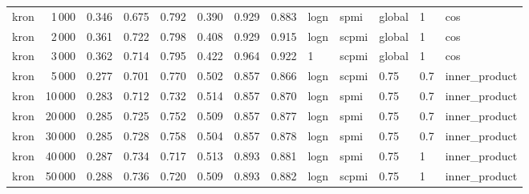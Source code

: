 \begin{tabular}{lrrrrrrrlllll}
    kron &            1\,000 &      0.346 &  0.675 &  0.792 &  0.390 &      0.929 &      0.883 &  logn &   spmi &  global &    1 &            cos \\
    kron &            2\,000 &      0.361 &  0.722 &  0.798 &  0.408 &      0.929 &      0.915 &  logn &  scpmi &  global &    1 &            cos \\
    kron &            3\,000 &      0.362 &  0.714 &  0.795 &  0.422 &      0.964 &      0.922 &     1 &  scpmi &  global &    1 &            cos \\
    kron &            5\,000 &      0.277 &  0.701 &  0.770 &  0.502 &      0.857 &      0.866 &  logn &  scpmi &    0.75 &  0.7 &  inner\_product \\
    kron &           10\,000 &      0.283 &  0.712 &  0.732 &  0.514 &      0.857 &      0.870 &  logn &   spmi &    0.75 &  0.7 &  inner\_product \\
    kron &           20\,000 &      0.285 &  0.725 &  0.752 &  0.509 &      0.857 &      0.877 &  logn &   spmi &    0.75 &  0.7 &  inner\_product \\
    kron &           30\,000 &      0.285 &  0.728 &  0.758 &  0.504 &      0.857 &      0.878 &  logn &   spmi &    0.75 &  0.7 &  inner\_product \\
    kron &           40\,000 &      0.287 &  0.734 &  0.717 &  0.513 &      0.893 &      0.881 &  logn &   spmi &    0.75 &    1 &  inner\_product \\
    kron &           50\,000 &      0.288 &  0.736 &  0.720 &  0.509 &      0.893 &      0.882 &  logn &  scpmi &    0.75 &    1 &  inner\_product \\
\bottomrule
\end{tabular}
